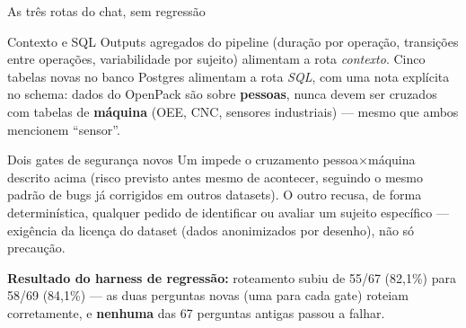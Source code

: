 \documentclass{beamer}
\newenvironment{numerobloco}[1]{\begin{block}{#1}}{\end{block}}
\newenvironment{decisaobloco}[1]{\begin{alertblock}{#1}}{\end{alertblock}}
\begin{document}
\begin{frame}{As três rotas do chat, sem regressão}
  \small
  \begin{numerobloco}{Contexto e SQL}
    Outputs agregados do pipeline (duração por operação, transições entre operações,
    variabilidade por sujeito) alimentam a rota \emph{contexto}. Cinco tabelas novas no banco
    Postgres alimentam a rota \emph{SQL}, com uma nota explícita no schema: dados do OpenPack
    são sobre \textbf{pessoas}, nunca devem ser cruzados com tabelas de \textbf{máquina}
    (OEE, CNC, sensores industriais) — mesmo que ambos mencionem ``sensor''.
  \end{numerobloco}

  \pause
  \begin{decisaobloco}{Dois gates de segurança novos}
    Um impede o cruzamento pessoa$\times$máquina descrito acima (risco previsto antes mesmo de
    acontecer, seguindo o mesmo padrão de bugs já corrigidos em outros datasets). O outro
    recusa, de forma determinística, qualquer pedido de identificar ou avaliar um sujeito
    específico — exigência da licença do dataset (dados anonimizados por desenho), não só
    precaução.
  \end{decisaobloco}

  \pause
  \textbf{Resultado do harness de regressão:} roteamento subiu de 55/67 (82,1\%) para 58/69
  (84,1\%) — as duas perguntas novas (uma para cada gate) roteiam corretamente, e
  \textbf{nenhuma} das 67 perguntas antigas passou a falhar.
\end{frame}
\end{document}
